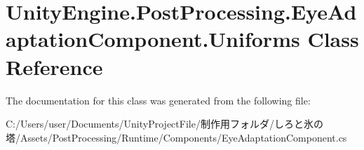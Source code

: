 \hypertarget{class_unity_engine_1_1_post_processing_1_1_eye_adaptation_component_1_1_uniforms}{}\section{Unity\+Engine.\+Post\+Processing.\+Eye\+Adaptation\+Component.\+Uniforms Class Reference}
\label{class_unity_engine_1_1_post_processing_1_1_eye_adaptation_component_1_1_uniforms}


The documentation for this class was generated from the following file\+:\begin{DoxyCompactItemize}
\item 
C\+:/\+Users/user/\+Documents/\+Unity\+Project\+File/制作用フォルダ/しろと氷の塔/\+Assets/\+Post\+Processing/\+Runtime/\+Components/Eye\+Adaptation\+Component.\+cs\end{DoxyCompactItemize}
